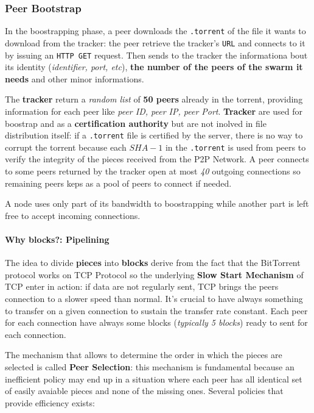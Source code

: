 \documentclass[10pt,a4paper]{report}
\begin{document}
\subsubsection{Peer Bootstrap}\label{sec:peer-bootstrap}
In the boostrapping phase, a peer downloads the \texttt{.torrent} of the file it wants to download from the tracker: the peer retrieve the tracker's \texttt{URL} and connects to it by issuing an \texttt{HTTP GET} request. Then sends to the tracker the informationa bout its identity (\textit{identifier, port, etc}), \textbf{the number of the peers of the swarm it needs} and other minor informations.

The \textbf{tracker} return a \textit{random list} of \textbf{50 peers} already in the torrent, providing information for each peer like \textit{peer ID, peer IP, peer Port}.
\textbf{Tracker} are used for boostrap and as a \textbf{certification authority} but are not inolved in file distribution itself: if a \texttt{.torrent} file is certified by the server, there is no way to corrupt the torrent because each $SHA-1$ in the \texttt{.torrent} is used from peers to verify the integrity of the pieces received from the P2P Network.
A peer connects to some peers returned by the tracker open at most \textit{40} outgoing connections so remaining peers keps as a pool of peers to connect if needed.

A node uses only part of its bandwidth to boostrapping while another part is left free to accept incoming connections.
\paragraph{Why blocks?: Pipelining}\label{sec:why-blocks-pipelining}
The idea to divide \textbf{pieces} into \textbf{blocks} derive from the fact that the BitTorrent protocol works on TCP Protocol so the underlying \textbf{Slow Start Mechanism} of TCP enter in action: if data are not regularly sent, TCP  brings the peers connection to a slower speed than normal.
It's crucial to have always something to transfer on a given connection to sustain the transfer rate constant.
Each peer for each connection have always some blocks (\textit{typically 5 blocks}) ready to sent for each connection.

The mechanism that allows to determine the order in which the pieces are selected is called \textbf{Peer Selection}: this mechanism is fundamental because an inefficient policy may end up in a situation where each peer has all identical set of easily avaiable pieces and none of the missing ones.
Several policies that provide efficiency exists:
\end{document}

